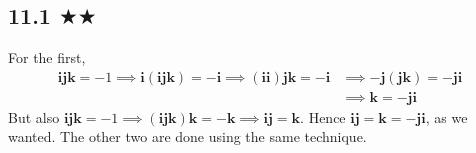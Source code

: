 
\subsection{11.1 $\bigstar\bigstar$}
For the first, 
\begin{align*}\mathbf{i}\mathbf{j}\mathbf{k}=-1\implies\mathbf{i}(\mathbf{i}\mathbf{j}\mathbf{k})=-\mathbf{i}\implies(\mathbf{i}\mathbf{i})\mathbf{j}\mathbf{k}=-\mathbf{i}&\implies-\mathbf{j}(\mathbf{j}\mathbf{k})=-\mathbf{j}\mathbf{i}\\
&\implies \mathbf{k}=-\mathbf{j}\mathbf{i}
\end{align*}
But also $\mathbf{i}\mathbf{j}\mathbf{k}=-1\implies(\mathbf{i}\mathbf{j}\mathbf{k})\mathbf{k}=-\mathbf{k}\implies\mathbf{i}\mathbf{j}=\mathbf{k}$. Hence $\mathbf{i}\mathbf{j}=\mathbf{k}=-\mathbf{j}\mathbf{i}$, as we wanted. The other two are done using the same technique.



